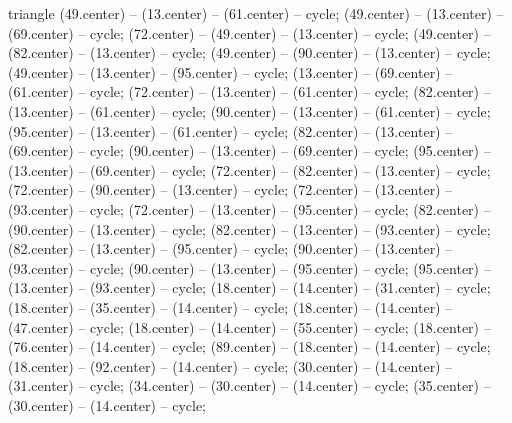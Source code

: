 \begin{pgfonlayer}{triangle}
 (49.center) -- (13.center) -- (61.center) -- cycle; 
 (49.center) -- (13.center) -- (69.center) -- cycle; 
 (72.center) -- (49.center) -- (13.center) -- cycle; 
 (49.center) -- (82.center) -- (13.center) -- cycle; 
 (49.center) -- (90.center) -- (13.center) -- cycle; 
 (49.center) -- (13.center) -- (95.center) -- cycle; 
 (13.center) -- (69.center) -- (61.center) -- cycle; 
 (72.center) -- (13.center) -- (61.center) -- cycle; 
 (82.center) -- (13.center) -- (61.center) -- cycle; 
 (90.center) -- (13.center) -- (61.center) -- cycle; 
 (95.center) -- (13.center) -- (61.center) -- cycle; 
 (82.center) -- (13.center) -- (69.center) -- cycle; 
 (90.center) -- (13.center) -- (69.center) -- cycle; 
 (95.center) -- (13.center) -- (69.center) -- cycle; 
 (72.center) -- (82.center) -- (13.center) -- cycle; 
 (72.center) -- (90.center) -- (13.center) -- cycle; 
 (72.center) -- (13.center) -- (93.center) -- cycle; 
 (72.center) -- (13.center) -- (95.center) -- cycle; 
 (82.center) -- (90.center) -- (13.center) -- cycle; 
 (82.center) -- (13.center) -- (93.center) -- cycle; 
 (82.center) -- (13.center) -- (95.center) -- cycle; 
 (90.center) -- (13.center) -- (93.center) -- cycle; 
 (90.center) -- (13.center) -- (95.center) -- cycle; 
 (95.center) -- (13.center) -- (93.center) -- cycle; 
 (18.center) -- (14.center) -- (31.center) -- cycle; 
 (18.center) -- (35.center) -- (14.center) -- cycle; 
 (18.center) -- (14.center) -- (47.center) -- cycle; 
 (18.center) -- (14.center) -- (55.center) -- cycle; 
 (18.center) -- (76.center) -- (14.center) -- cycle; 
 (89.center) -- (18.center) -- (14.center) -- cycle; 
 (18.center) -- (92.center) -- (14.center) -- cycle; 
 (30.center) -- (14.center) -- (31.center) -- cycle; 
 (34.center) -- (30.center) -- (14.center) -- cycle; 
 (35.center) -- (30.center) -- (14.center) -- cycle; 

\end{pgfonlayer}
